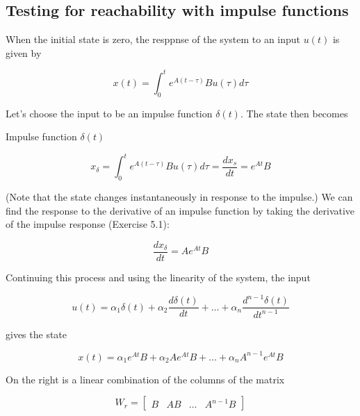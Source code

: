 \subsection{Testing for reachability with impulse functions}

When the initial state is zero, the resppnse of the system to an input $u(t)$ is given by

\begin{equation}
x(t) = \int_{0}^{t} e^{A(t-\tau)}Bu(\tau)d\tau
\end{equation}

Let's choose the input to be an impulse function $\delta(t)$. The state then becomes


\begin{framed}
\theoremstyle{remark}
\begin{remark}{Impulse function $\delta(t)$}

\end{remark}
\end{framed}

\begin{equation}
x_{\delta}  = \int_{0}^{t} e^{A(t-\tau)}Bu(\tau)d\tau = \frac{dx_s}{dt} = e^{At}B
\end{equation}

(Note that the state changes instantaneously in response to the impulse.) We can
find the response to the derivative of an impulse function by taking the derivative
of the impulse response (Exercise 5.1):

\begin{equation}
\frac{dx_{\delta}}{dt} = Ae^{At}B
\end{equation}

Continuing this process and using the linearity of the system, the input

\begin{equation}
u(t) = \alpha_1\delta(t) + \alpha_2 \frac{d\delta(t)}{dt} + \dots +  \alpha_n \frac{d^{n-1}\delta(t)}{dt^{n-1}}  
\end{equation}

gives the state

\begin{equation}
x(t) = \alpha_1e^{At}B + \alpha_2Ae^{At}B + \dots +  \alpha_n A^{n-1}e^{At}B  
\end{equation}

On the right is a linear combination of the columns of the matrix

\begin{equation}
W_r = \begin{bmatrix}
 B & AB & \ldots & A^{n-1}B 
\end{bmatrix}
\end{equation}


